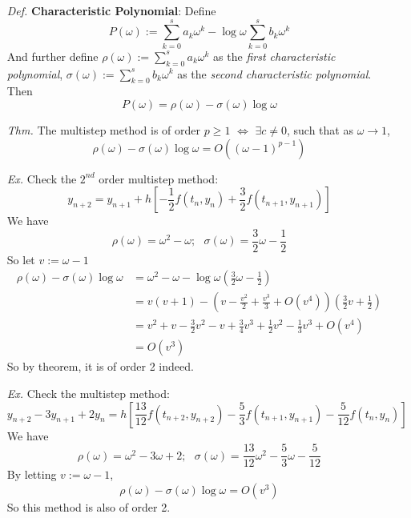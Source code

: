 \documentclass[a4paper, 11pt]{article}
\begin{document}
\begin{itemize}
	\item[\textit{Def.}] \textbf{Characteristic Polynomial}: Define 
	$$
	P(\omega) := \sum_{k=0}^s a_k \omega^k - \log\omega \sum_{k=0}^s b_k \omega^k
	$$
	And further define $\rho(\omega):=\sum_{k=0}^s a_k \omega^k$ as the \emph{first characteristic polynomial}, $\sigma(\omega):=\sum_{k=0}^s b_k \omega^k$ as the \emph{second characteristic polynomial}. Then
	$$
	P(\omega) = \rho(\omega) - \sigma(\omega)\log \omega 
	$$
	\item[\textit{Thm.}] The multistep method is of order $p\geq 1$ $\iff$ $\exists c\ne 0$, such that as $\omega \to 1$,
	$$
	\rho(\omega) - \sigma(\omega) \log \omega = O\left((\omega-1)^{p-1}\right)
	$$

	\item[\textit{Ex.}] Check the $2^{nd}$ order multistep method:
	$$
	y_{n+2} = y_{n+1} + h \left[-\frac{1}{2}f(t_n, y_n)+\frac{3}{2}f(t_{n+1}, y_{n+1})\right]
	$$
	We have
	$$
	\rho(\omega) = \omega^2 - \omega;~~~\sigma(\omega) = \frac{3}{2}\omega - \frac{1}{2}
	$$
	So let $v:=\omega-1$
	\begin{equation}
		\begin{split}
			\rho(\omega) - \sigma(\omega) \log \omega &= \omega^2 - \omega - \log \omega \left(\frac{3}{2}\omega - \frac{1}{2}\right) \\
			&= v(v+1) - \left(v-\frac{v^2}{2}+\frac{v^3}{3}+O(v^4)\right) \left(\frac{3}{2}v + \frac{1}{2}\right) \\
			&= v^2 + v -\frac{3}{2}v^2 - v + \frac{3}{4}v^3 + \frac{1}{2}v^2-\frac{1}{3}v^3 + O(v^4) \\
			& = O(v^3)
		\end{split}
	\end{equation}
	So by theorem, it is of order 2 indeed.

	\item[\textit{Ex.}] Check the multistep method:
	$$
	y_{n+2} - 3y_{n+1} + 2y_n = h \left[\frac{13}{12}f(t_{n+2}, y_{n+2})-\frac{5}{3}f(t_{n+1}, y_{n+1})-\frac{5}{12}f(t_n, y_n)\right]
	$$
	We have
	$$
	\rho(\omega) = \omega^2 - 3\omega + 2;~~~\sigma(\omega) = \frac{13}{12}\omega^2 - \frac{5}{3}\omega - \frac{5}{12}
	$$
	By letting $v:=\omega-1$,
	$$
	\rho(\omega) - \sigma(\omega) \log \omega = O(v^3)
	$$
	So this method is also of order 2.
\end{itemize}
\end{document}
